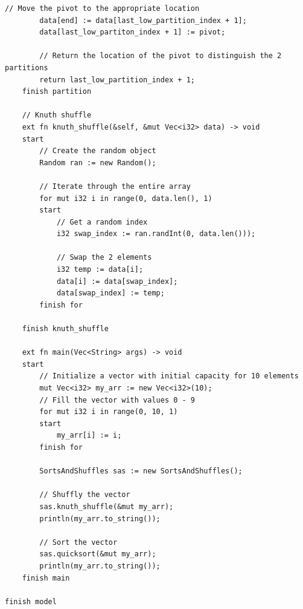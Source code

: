 \documentclass[letterpaper, 10pt, DIV=13]{scrartcl}
\numberwithin{equation}{section}
\numberwithin{figure}{section}
\numberwithin{table}{section}
\begin{document}
\begin{lstlisting}[caption = SortsAndShuffles.rez, frame = single, nolol]
        // Move the pivot to the appropriate location
        data[end] := data[last_low_partition_index + 1];
        data[last_low_partiton_index + 1] := pivot;

        // Return the location of the pivot to distinguish the 2 partitions
        return last_low_partition_index + 1;
    finish partition

    // Knuth shuffle
    ext fn knuth_shuffle(&self, &mut Vec<i32> data) -> void
    start
        // Create the random object
        Random ran := new Random();

        // Iterate through the entire array
        for mut i32 i in range(0, data.len(), 1)
        start
            // Get a random index
            i32 swap_index := ran.randInt(0, data.len()));

            // Swap the 2 elements
            i32 temp := data[i];
            data[i] := data[swap_index];
            data[swap_index] := temp;
        finish for

    finish knuth_shuffle

    ext fn main(Vec<String> args) -> void
    start
        // Initialize a vector with initial capacity for 10 elements
        mut Vec<i32> my_arr := new Vec<i32>(10);
        // Fill the vector with values 0 - 9
        for mut i32 i in range(0, 10, 1)
        start
            my_arr[i] := i;
        finish for
        
        SortsAndShuffles sas := new SortsAndShuffles();

        // Shuffly the vector
        sas.knuth_shuffle(&mut my_arr);
        println(my_arr.to_string());

        // Sort the vector
        sas.quicksort(&mut my_arr);
        println(my_arr.to_string());
    finish main

finish model
\end{lstlisting}
\end{document}
